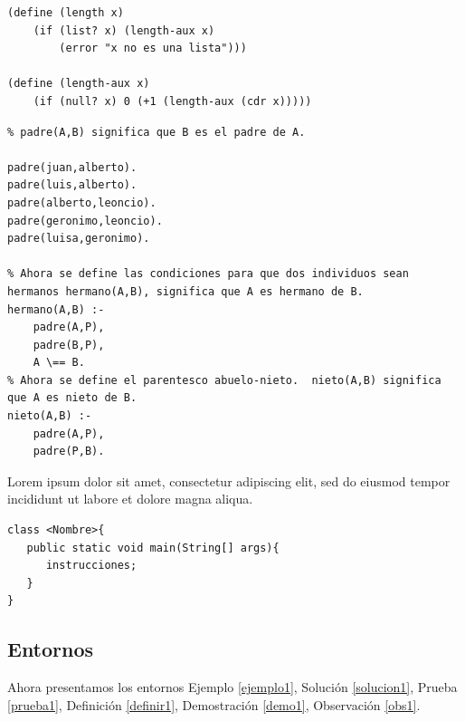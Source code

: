 \lstset{language=LISP}
\begin{lstlisting}[caption= C\'odigo LISP de una Lista, label = codL]
(define (length x)
    (if (list? x) (length-aux x)
        (error "x no es una lista")))
        
(define (length-aux x)
    (if (null? x) 0 (+1 (length-aux (cdr x)))))
\end{lstlisting}




\lstset{language=PROLOG}
\begin{lstlisting}[caption= C\'odigo PROLOG de un \'arbol geneal\'ogico, label=codP]
% Arbol genealogico version 1.
% padre(A,B) significa que B es el padre de A.

padre(juan,alberto).
padre(luis,alberto).
padre(alberto,leoncio). 
padre(geronimo,leoncio).
padre(luisa,geronimo). 

% Ahora se define las condiciones para que dos individuos sean hermanos hermano(A,B), significa que A es hermano de B.
hermano(A,B) :- 
    padre(A,P), 
    padre(B,P), 
    A \== B.
% Ahora se define el parentesco abuelo-nieto.  nieto(A,B) significa que A es nieto de B.
nieto(A,B) :- 
    padre(A,P), 
    padre(P,B). 
\end{lstlisting}

Lorem ipsum dolor sit amet, consectetur adipiscing elit, sed do eiusmod tempor incididunt ut labore et dolore magna aliqua.

   \lstset{language=java}
\begin{lstlisting}[caption= C\'odigo JAVA de una clase, label=codj]
class <Nombre>{
   public static void main(String[] args){
      instrucciones;
   }
}
\end{lstlisting}








\subsection{Entornos}
Ahora presentamos los entornos Ejemplo \ref{ejemplo1}, Solución \ref{solucion1}, Prueba \ref{prueba1}, Definición \ref{definir1}, Demostración \ref{demo1}, Observación \ref{obs1}.

\begin{ejemplo}\label{ejemplo1}
\lipsum[1] %
\end{ejemplo}

\begin{solucion}\label{solucion1}
\lipsum[1] %
\end{solucion}

